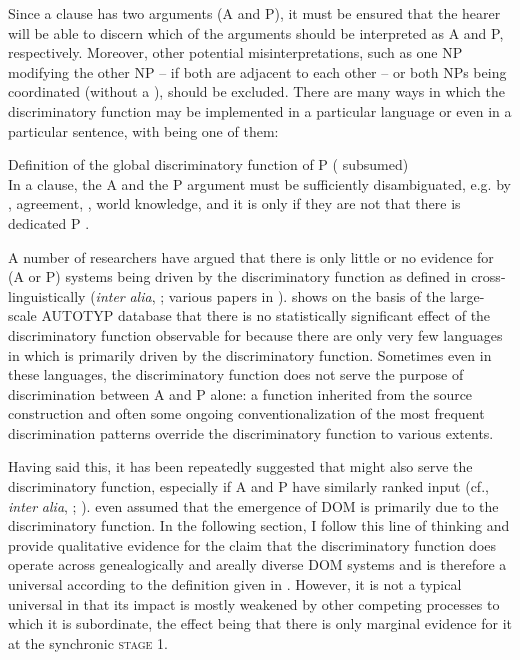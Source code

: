 \documentclass[output=paper]{langsci/langscibook}
\begin{document}
Since a  clause has two arguments (A and P), it must be ensured that the hearer will be able to discern which of the arguments should be interpreted as A and P, respectively. Moreover, other potential misinterpretations, such as one NP modifying the other NP – if both are adjacent to each other – or both NPs being coordinated (without a ), should be excluded. There are many ways in which the discriminatory function may be implemented in a particular language or even in a particular sentence, with  being one of them: 

\eanoraggedright\label{ex:serzant:3}
Definition of the global discriminatory function of P  ( subsumed)\\
In a  clause, the A and the P argument must be sufficiently disambiguated, e.g. by , agreement, , world knowledge, and it is only if they are not that there is dedicated P .
\z

A number of researchers have argued that there is only little or no evidence for (A or P)  systems being driven by the discriminatory function as defined in  cross-linguistically (\textit{inter} \textit{alia}, \citealt{Aissen2003,Malchukov2008}; various papers in \citealt{deHoopdeSwart2009}). \citet{Levshina2018_Effic} shows on the basis of the large-scale AUTOTYP database that there is no statistically significant effect of the discriminatory function observable for  because there are only very few languages in which  is primarily driven by the discriminatory function. Sometimes even in these languages, the discriminatory function does not serve the purpose of discrimination between A and P alone: a function inherited from the source construction and often some ongoing conventionalization of the most frequent discrimination patterns override the discriminatory function to various extents. 

Having said this, it has been repeatedly suggested that  might also serve the discriminatory function, especially if A and P have similarly ranked input (cf., \textit{inter} \textit{alia}, \citealt{Comrie1978,Comrie1989}; \citealt{Dixon1994,Silverstein1976,Kibrik1997}). \citet[117]{Bossong1985} even assumed that the emergence of DOM is primarily due to the discriminatory function. In the following section, I follow this line of thinking and provide qualitative evidence for the claim that the discriminatory function does operate across genealogically and areally diverse DOM systems and is therefore a universal according to the definition given in . However, it is not a typical universal in that its impact is mostly weakened by other competing processes to which it is subordinate, the effect being that there is only marginal evidence for it at the synchronic \textsc{stage} 1.
\end{document}
